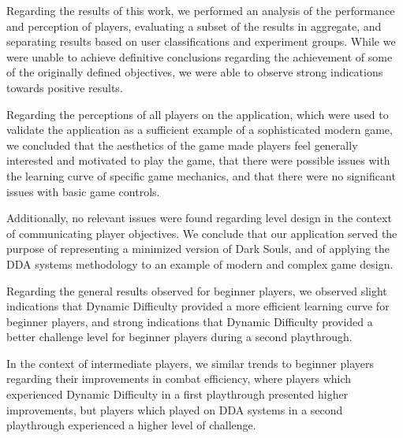 Regarding the results of this work, we performed an analysis of the performance and perception of players, evaluating a subset of the results in aggregate, and separating results based on user classifications and experiment groups. While we were unable to achieve definitive conclusions regarding the achievement of some of the originally defined objectives, we were able to observe strong indications towards positive results.

Regarding the perceptions of all players on the application, which were used to validate the application as a sufficient example of a sophisticated modern game, we concluded that the aesthetics of the game made players feel generally interested and motivated to play the game, that there were possible issues with the learning curve of specific game mechanics, and that there were no significant issues with basic game controls.

Additionally, no relevant issues were found regarding level design in the context of communicating player objectives. We conclude that our application served the purpose of representing a minimized version of Dark Souls, and of applying the DDA systems methodology to an example of modern and complex game design.

Regarding the general results observed for beginner players, we observed slight indications that Dynamic Difficulty provided a more efficient learning curve for beginner players, and strong indications that Dynamic Difficulty provided a better challenge level for beginner players during a second playthrough.

In the context of intermediate players, we similar trends to beginner players regarding their improvements in combat efficiency, where players which experienced Dynamic Difficulty in a first playthrough presented higher improvements, but players which played on DDA systems in a second playthrough experienced a higher level of challenge.

